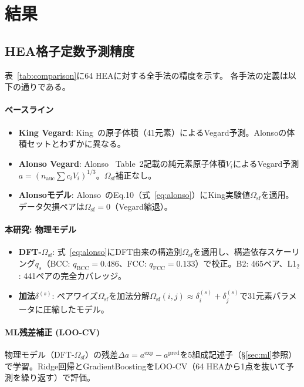 \documentclass[5p,10pt]{elsarticle}
\begin{document}
\section{結果}
\label{sec:results}

\subsection{HEA格子定数予測精度}
\label{sec:results_hea}

表~\ref{tab:comparison}に64 HEAに対する全手法の精度を示す。
各手法の定義は以下の通りである。

\paragraph{ベースライン}
\begin{itemize}
  \item \textbf{King Vegard}:
    King~\cite{King1966}の原子体積（41元素）によるVegard予測。Alonsoの体積セットとわずかに異なる。
  \item \textbf{Alonso Vegard}:
    Alonso~\cite{Alonso2021} Table~2記載の純元素原子体積$V_i$によるVegard予測$a = (n_\text{auc}\sum c_i V_i)^{1/3}$。$\Omega_\text{sf}$補正なし。
  \item \textbf{Alonsoモデル}:
    Alonso~\cite{Alonso2021}のEq.10（式~\ref{eq:alonso}）にKing実験値$\Omega_\text{sf}$を適用。データ欠損ペアは$\Omega_\text{sf} = 0$（Vegard縮退）。
\end{itemize}

\paragraph{本研究: 物理モデル}
\begin{itemize}
  \item \textbf{DFT-$\Omega_\text{sf}$}:
    式~\ref{eq:alonso}にDFT由来の構造別$\Omega_\text{sf}$を適用し、構造依存スケーリング$q_s$（BCC: $q_\text{BCC} = 0.486$、FCC: $q_\text{FCC} = 0.133$）で校正。B2: 465ペア、L1$_2$: 441ペアの完全カバレッジ。
  \item \textbf{加法$\delta^{(s)}$}:
    ペアワイズ$\Omega_\text{sf}$を加法分解$\Omega_\text{sf}(i,j) \approx \delta_i^{(s)} + \delta_j^{(s)}$で31元素パラメータに圧縮したモデル。
\end{itemize}

\paragraph{ML残差補正 (LOO-CV)}
物理モデル（DFT-$\Omega_\text{sf}$）の残差$\Delta a = a^\text{exp} - a^\text{pred}$を5組成記述子（§\ref{sec:ml}参照）で学習。Ridge回帰とGradientBoostingをLOO-CV（64 HEAから1点を抜いて予測を繰り返す）で評価。
\end{document}
